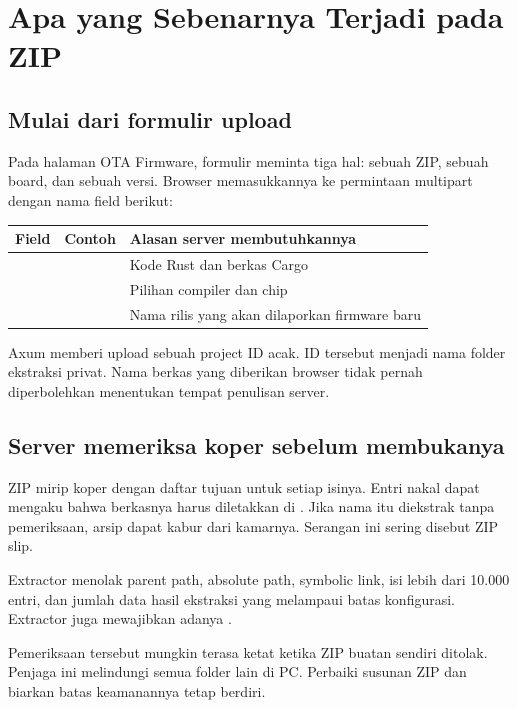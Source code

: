 \chapter{Apa yang Sebenarnya Terjadi pada ZIP}

\section{Mulai dari formulir upload}

Pada halaman OTA Firmware, formulir meminta tiga hal: sebuah ZIP, sebuah board, dan sebuah versi. Browser memasukkannya ke permintaan multipart dengan nama field berikut:

\begin{center}
\begin{tabularx}{0.9\textwidth}{l l Y}
\toprule
Field & Contoh & Alasan server membutuhkannya\\
\midrule
{} &  & Kode Rust dan berkas Cargo\\
 &  & Pilihan compiler dan chip\\
 &  & Nama rilis yang akan dilaporkan firmware baru\\
\bottomrule
\end{tabularx}
\end{center}

Axum memberi upload sebuah project ID acak. ID tersebut menjadi nama folder ekstraksi privat. Nama berkas yang diberikan browser tidak pernah diperbolehkan menentukan tempat penulisan server.

\section{Server memeriksa koper sebelum membukanya}

ZIP mirip koper dengan daftar tujuan untuk setiap isinya. Entri nakal dapat mengaku bahwa berkasnya harus diletakkan di . Jika nama itu diekstrak tanpa pemeriksaan, arsip dapat kabur dari kamarnya. Serangan ini sering disebut ZIP slip.

Extractor menolak parent path, absolute path, symbolic link, isi lebih dari 10.000 entri, dan jumlah data hasil ekstraksi yang melampaui batas konfigurasi. Extractor juga mewajibkan adanya .

Pemeriksaan tersebut mungkin terasa ketat ketika ZIP buatan sendiri ditolak. Penjaga ini melindungi semua folder lain di PC. Perbaiki susunan ZIP dan biarkan batas keamanannya tetap berdiri.

